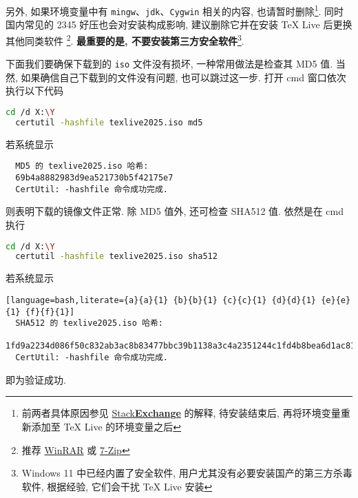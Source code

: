 另外, 如果环境变量中有 \texttt{mingw}、\texttt{jdk}、\texttt{Cygwin} 相关的内容,
也请暂时删除\footnote{前两者具体原因参见
\href{https://tex.stackexchange.com/questions/445086/error-installing-latest-version-of-tex-live-on-windows-10}{\textsf{Stack\textbf{Exchange}}}
的解释, 待安装结束后, 再将环境变量重新添加至 \TeX{} Live 的环境变量之后}.
同时国内常见的 2345 好压也会对安装构成影响,
建议删除它并在安装 \TeX{} Live 后更换其他同类软件%
\footnote{推荐 \href{http://www.winrar.com.cn/}{WinRAR}
或 \href{https://www.7-zip.org/}{7-Zip}}.
\textbf{最重要的是, 不要安装第三方安全软件}\footnote{Windows 11 中已经内置了安全软件,
用户尤其没有必要安装国产的第三方杀毒软件,
根据经验,
它们会干扰 \TeX{} Live 安装}.

下面我们要确保下载到的 \texttt{iso} 文件没有损坏, 一种常用做法是检查其 MD5 值.
当然, 如果确信自己下载到的文件没有问题, 也可以跳过这一步.
打开 \textsf{cmd} 窗口依次执行以下代码
\begin{lstlisting}[language = bash]
  cd /d X:\Y
  certutil -hashfile texlive2025.iso md5
\end{lstlisting}
若系统显示
\begin{lstlisting}
  MD5 的 texlive2025.iso 哈希:
  69b4a8882983d9ea521730b5f42175e7
  CertUtil: -hashfile 命令成功完成.
\end{lstlisting}
则表明下载的镜像文件正常.
除 MD5 值外,
还可检查 SHA512 值.
依然是在 \textsf{cmd} 执行
\begin{lstlisting}[language = bash]
  cd /d X:\Y
  certutil -hashfile texlive2025.iso sha512
\end{lstlisting}
若系统显示
\begin{lstlisting}[language=bash,literate={a}{a}{1} {b}{b}{1} {c}{c}{1} {d}{d}{1} {e}{e}{1} {f}{f}{1}]
  SHA512 的 texlive2025.iso 哈希:
  1fd9a2234d086f50c832ab3ac8b83477bbc39b1138a3c4a2351244c1fd4b8bea6d1ac81d4a5b0cba95f2e82c00f0d9df5b33189eb222e4bae5dae1523ef0da0e
  CertUtil: -hashfile 命令成功完成.
\end{lstlisting}
即为验证成功.

